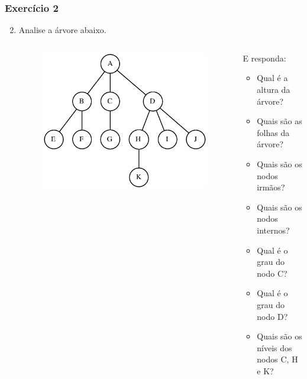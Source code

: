\documentclass[aspectratio=169]{beamer}
\begin{document}
\begin{frame}[fragile]\frametitle{Exercício 2}
\begin{enumerate}
        \setcounter{enumi}{1}
\item Analise a árvore abaixo.
\begin{columns}[T]
\begin{column}{0.5\linewidth}
\begin{figure}[h]
	\centering
	\includegraphics[height=0.5\paperheight]{imagens/exercicio02.eps}
\end{figure}
\end{column}
\begin{column}{0.5\linewidth}
E responda:
\begin{itemize}
	\item Qual é a altura da árvore?\\
	\item Quais são as folhas da árvore?\\
	\item Quais são os nodos irmãos?\\
	\item Quais são os nodos internos?
	\item Qual é o grau do nodo C?
	\item Qual é o grau do nodo D?
	\item Quais são os níveis dos nodos C, H e K?
\end{itemize}
\end{column}
\end{columns}
\end{enumerate}
\end{frame}
\end{document}

